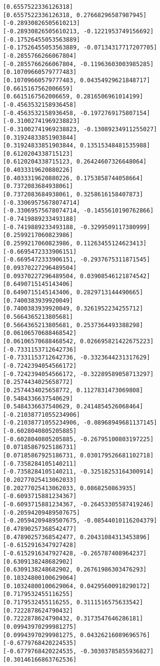 \documentclass[11pt]{article}
\begin{document}
\begin{Verbatim}[commandchars=\\\{\}]
[0.6557522336126318]
[0.6557522336126318, 0.27668296587987945]
[-0.28930826505610213]
[-0.28930826505610213, -0.1221953749156692]
[-0.17526455053563889]
[-0.17526455053563889, -0.07134317717207705]
[-0.2855766266067804]
[-0.2855766266067804, -0.11963603003985285]
[0.10709660579777483]
[0.10709660579777483, 0.04354929621848717]
[0.6615167562006659]
[0.6615167562006659, 0.2816506961014199]
[-0.4563532158936458]
[-0.4563532158936458, -0.1972769175807154]
[-0.31002741969238823]
[-0.31002741969238823, -0.13089234911255027]
[0.31924833851903844]
[0.31924833851903844, 0.13515348481535988]
[0.6120204338715123]
[0.6120204338715123, 0.26424607326648064]
[0.4033319620880226]
[0.4033319620880226, 0.1753858744058664]
[0.7372083684938061]
[0.7372083684938061, 0.3258616158407873]
[-0.33069575678074714]
[-0.33069575678074714, -0.1455610190762866]
[-0.7419889233493188]
[-0.7419889233493188, -0.3299509117380999]
[0.2599217060823986]
[0.2599217060823986, 0.11263455124623413]
[-0.6695472333906151]
[-0.6695472333906151, -0.2937675311871545]
[0.09370227296489504]
[0.09370227296489504, 0.03908546121874542]
[0.6490715145143406]
[0.6490715145143406, 0.2829713144490665]
[0.7400383939920049]
[0.7400383939920049, 0.3261952234255712]
[0.5664365213805681]
[0.5664365213805681, 0.2537364493388298]
[0.06106570688468542]
[0.06106570688468542, 0.026695821422675223]
[-0.7331153712642736]
[-0.7331153712642736, -0.3323644231317629]
[-0.7242394054566172]
[-0.7242394054566172, -0.32289589058713297]
[0.2574434025658772]
[0.2574434025658772, 0.1127831473069808]
[0.5484336637540629]
[0.5484336637540629, 0.2414854526068464]
[-0.21038771055234906]
[-0.21038771055234906, -0.08968949681137145]
[-0.6028040805205885]
[-0.6028040805205885, -0.26795100803197225]
[0.07185867925186731]
[0.07185867925186731, 0.030179526681102718]
[-0.7358284105140211]
[-0.7358284105140211, -0.32518253164300914]
[0.20277025413062033]
[0.20277025413062033, 0.0868250863935]
[-0.6093715881234367]
[-0.6093715881234367, -0.26453305587419246]
[-0.20594209489507675]
[-0.20594209489507675, -0.08544010116204379]
[0.47890257368542477]
[0.47890257368542477, 0.20431084313453896]
[-0.6152916347927428]
[-0.6152916347927428, -0.265787408964237]
[0.6309138248682902]
[0.6309138248682902, 0.26761986303476293]
[0.10324800100629064]
[0.10324800100629064, 0.04295600918290172]
[0.7179532455116255]
[0.7179532455116255, 0.3111516575633542]
[0.7222878624790432]
[0.7222878624790432, 0.3173547646286181]
[0.09943970299981275]
[0.09943970299981275, 0.04326216089696576]
[-0.6779768420224535]
[-0.6779768420224535, -0.30303785855936827]
[0.30146166863762536]

\end{Verbatim}
\end{document}
